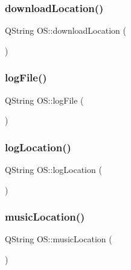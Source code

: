 \subsubsection{\texorpdfstring{downloadLocation()}{downloadLocation()}}
{\footnotesize\ttfamily Q\+String O\+S\+::download\+Location (\begin{DoxyParamCaption}{ }\end{DoxyParamCaption})}

\mbox{\label{classOS_a85848812c46025d92b9a061df85d9bce}} 
\subsubsection{\texorpdfstring{logFile()}{logFile()}}
{\footnotesize\ttfamily Q\+String O\+S\+::log\+File (\begin{DoxyParamCaption}{ }\end{DoxyParamCaption})}

\mbox{\label{classOS_a5f0bcd7c973d5875be519ec3a06629f2}} 
\subsubsection{\texorpdfstring{logLocation()}{logLocation()}}
{\footnotesize\ttfamily Q\+String O\+S\+::log\+Location (\begin{DoxyParamCaption}{ }\end{DoxyParamCaption})}

\mbox{\label{classOS_a611cc2d2496f6974b5087e8e2d3085e6}} 
\subsubsection{\texorpdfstring{musicLocation()}{musicLocation()}}
{\footnotesize\ttfamily Q\+String O\+S\+::music\+Location (\begin{DoxyParamCaption}{ }\end{DoxyParamCaption})}

\mbox{\label{classOS_afa7ce7d8541fbbd43d82f09f8662af44}} 
